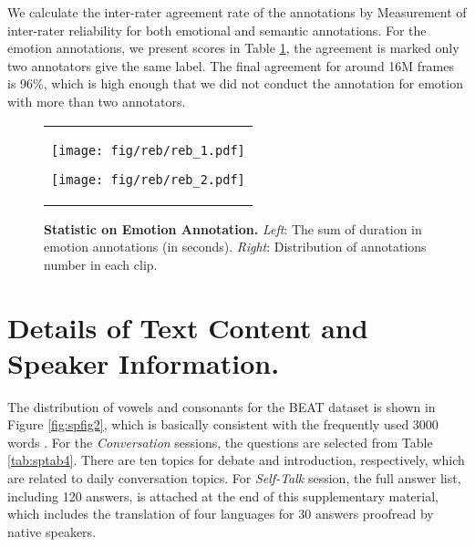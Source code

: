 \documentclass[runningheads]{llncs}
\begin{document}
We calculate the inter-rater agreement rate of the annotations by Measurement of inter-rater reliability for both emotional and semantic annotations. For the emotion annotations, we present scores in Table \ref{tab:tabsup1}, the agreement is marked only two annotators give the same label. The final agreement for around 16M frames is 96\%, which is high enough that we did not conduct the annotation for emotion with more than two annotators.


\begin{figure}
\caption{\textbf{Statistic on Emotion Annotation.} \textit{Left}: The sum of duration in emotion annotations (in seconds). \textit{Right}: Distribution of annotations number in each clip.}
\label{tab:tabsup1}
\begin{tabular}{c}
\begin{minipage}[b]{0.50\hsize}
\centering
\texttt{[image: fig/reb/reb\_1.pdf]}
\end{minipage}
\begin{minipage}[b]{0.50\hsize}
\centering

\texttt{[image: fig/reb/reb\_2.pdf]}
\end{minipage}
\end{tabular}
\end{figure}

\begin{table}[h]
\centering
\caption{Example of inter-rater reliability calculation for emotion annotation. a1 and a2 indicates annotator 1 and 2, respectively.}
\label{tab:tabsup1}
\end{table}

\section{Details of Text Content and Speaker Information.}
The distribution of vowels and consonants for the BEAT dataset is shown in Figure \ref{fig:spfig2}, which is basically consistent with the frequently used 3000 words \cite{hornbyoxford}. For the \textit{Conversation} sessions, the questions are selected from Table \ref{tab:sptab4}. There are ten topics for debate and introduction, respectively, which are related to daily conversation topics. For \textit{Self-Talk} session, the full answer list, including 120 answers, is attached at the end of this supplementary material, which includes the translation of four languages for 30 answers proofread by native speakers.  
\end{document}
